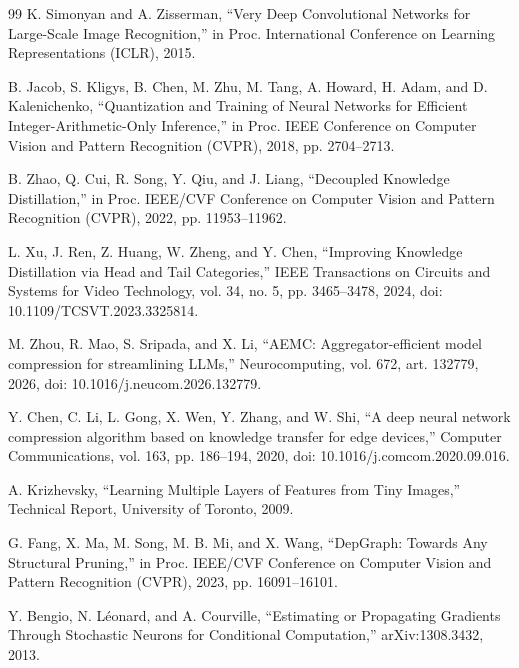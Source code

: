 \documentclass[oneside,a4paper,12pt]{report}
\begin{document}
\begin{thebibliography}{99}
 K. Simonyan and A. Zisserman, ``Very Deep Convolutional Networks for Large-Scale Image Recognition,'' in Proc. International Conference on Learning Representations (ICLR), 2015.

 B. Jacob, S. Kligys, B. Chen, M. Zhu, M. Tang, A. Howard, H. Adam, and D. Kalenichenko, ``Quantization and Training of Neural Networks for Efficient Integer-Arithmetic-Only Inference,'' in Proc. IEEE Conference on Computer Vision and Pattern Recognition (CVPR), 2018, pp. 2704--2713.

 B. Zhao, Q. Cui, R. Song, Y. Qiu, and J. Liang, ``Decoupled Knowledge Distillation,'' in Proc. IEEE/CVF Conference on Computer Vision and Pattern Recognition (CVPR), 2022, pp. 11953--11962.

 L. Xu, J. Ren, Z. Huang, W. Zheng, and Y. Chen, ``Improving Knowledge Distillation via Head and Tail Categories,'' IEEE Transactions on Circuits and Systems for Video Technology, vol. 34, no. 5, pp. 3465–3478, 2024, doi: 10.1109/TCSVT.2023.3325814.

 M. Zhou, R. Mao, S. Sripada, and X. Li, ``AEMC: Aggregator-efficient model compression for streamlining LLMs,'' Neurocomputing, vol. 672, art. 132779, 2026, doi: 10.1016/j.neucom.2026.132779.

 Y. Chen, C. Li, L. Gong, X. Wen, Y. Zhang, and W. Shi, ``A deep neural network compression algorithm based on knowledge transfer for edge devices,'' Computer Communications, vol. 163, pp. 186–194, 2020, doi: 10.1016/j.comcom.2020.09.016.

 A. Krizhevsky, ``Learning Multiple Layers of Features from Tiny Images,'' Technical Report, University of Toronto, 2009.

 G. Fang, X. Ma, M. Song, M. B. Mi, and X. Wang, ``DepGraph: Towards Any Structural Pruning,'' in Proc. IEEE/CVF Conference on Computer Vision and Pattern Recognition (CVPR), 2023, pp. 16091--16101.

 Y. Bengio, N. L\'eonard, and A. Courville, ``Estimating or Propagating Gradients Through Stochastic Neurons for Conditional Computation,'' arXiv:1308.3432, 2013.
\end{thebibliography}
\end{document}
